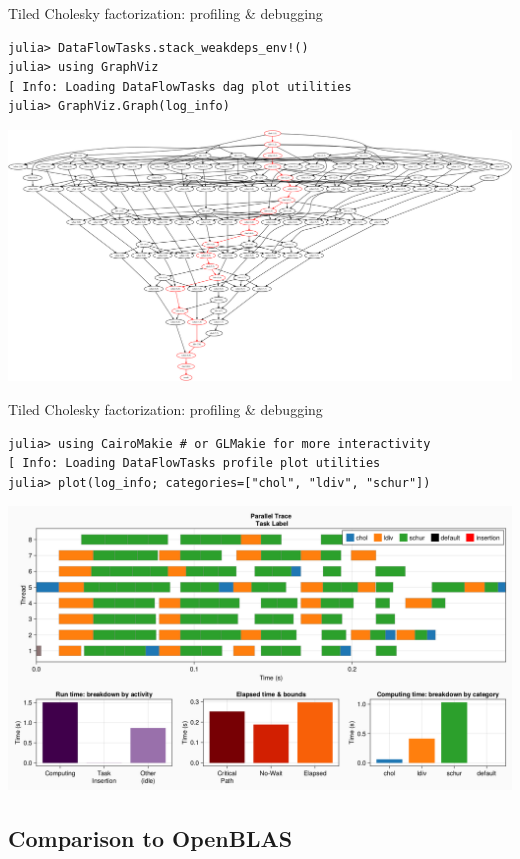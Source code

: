 \documentclass{beamer}
\begin{document}
\begin{frame}[fragile]{Tiled Cholesky factorization: profiling \& debugging}
\begin{verbatim}
julia> DataFlowTasks.stack_weakdeps_env!()
julia> using GraphViz
[ Info: Loading DataFlowTasks dag plot utilities
julia> GraphViz.Graph(log_info)
\end{verbatim}
\includegraphics[width=\textwidth]{Cholesky_dag.png}
\end{frame}

\begin{frame}[fragile]{Tiled Cholesky factorization: profiling \& debugging}
\begin{verbatim}
julia> using CairoMakie # or GLMakie for more interactivity
[ Info: Loading DataFlowTasks profile plot utilities
julia> plot(log_info; categories=["chol", "ldiv", "schur"])
\end{verbatim}
\includegraphics[width=\textwidth]{Cholesky_profile.png}

\end{frame}

\subsection{Comparison to OpenBLAS}
\end{document}
